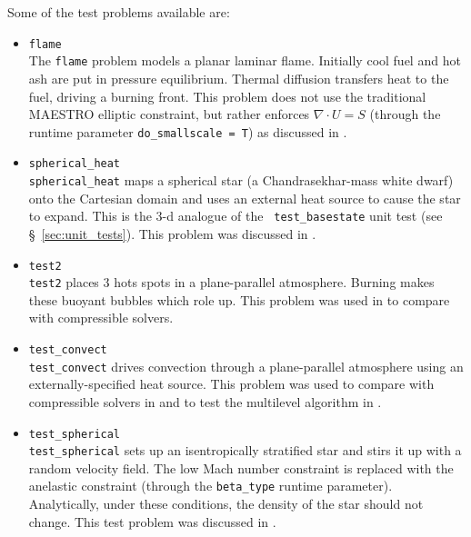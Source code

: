 Some of the test problems available are:
\begin{itemize}
\item {\tt flame} \\[-3mm]

The {\tt flame} problem models a planar laminar flame.  Initially cool
fuel and hot ash are put in pressure equilibrium.  Thermal diffusion
transfers heat to the fuel, driving a burning front.  This problem
does not use the traditional MAESTRO elliptic constraint, but
rather enforces $\nabla \cdot U = S$ (through the runtime parameter
{\tt do\_smallscale = T}) as discussed in \cite{SNe}.

\item {\tt spherical\_heat} \\[-3mm]

{\tt spherical\_heat} maps a spherical star (a Chandrasekhar-mass white
dwarf) onto the Cartesian domain and uses an external heat source to
cause the star to expand.  This is the 3-d analogue of the {\tt
  test\_basestate} unit test (see \S~\ref{sec:unit_tests}).  This
problem was discussed in \cite{multilevel}.

\item {\tt test2} \\[-3mm]

{\tt test2} places 3 hots spots in a plane-parallel atmosphere.
Burning makes these buoyant bubbles which role up.  This problem was
used in \cite{lowMach3} to compare with compressible solvers.

\item {\tt test\_convect} \\[-3mm]

{\tt test\_convect} drives convection through a plane-parallel
atmosphere using an externally-specified heat source.  This problem
was used to compare with compressible solvers in \cite{lowMach3}
and to test the multilevel algorithm in \cite{multilevel}.

\item {\tt test\_spherical} \\[-3mm]

{\tt test\_spherical} sets up an isentropically stratified star
and stirs it up with a random velocity field.  The low Mach number
constraint is replaced with the anelastic constraint (through
the {\tt beta\_type} runtime parameter).  Analytically, under
these conditions, the density of the star should not change.
This test problem was discussed in \cite{lowMach4}.

\end{itemize}


